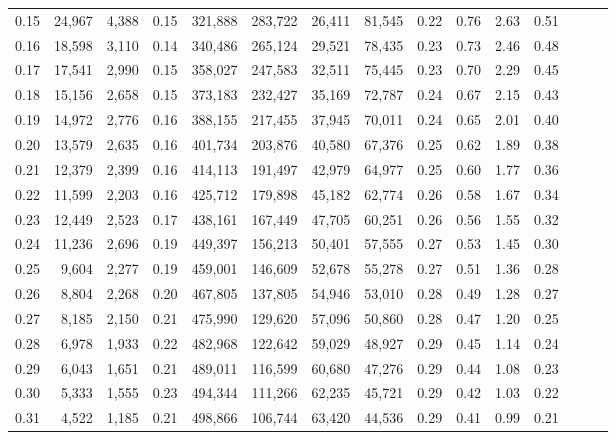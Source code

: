 \begin{tabular}{rrrrrrrrrrrrrrr}
0.15 &  24,967 &  4,388 &  0.15 &  321,888 &  283,722 &   26,411 &   81,545 &  0.22 &  0.76 &  2.63 &      0.51 \\
0.16 &  18,598 &  3,110 &  0.14 &  340,486 &  265,124 &   29,521 &   78,435 &  0.23 &  0.73 &  2.46 &      0.48 \\
0.17 &  17,541 &  2,990 &  0.15 &  358,027 &  247,583 &   32,511 &   75,445 &  0.23 &  0.70 &  2.29 &      0.45 \\
0.18 &  15,156 &  2,658 &  0.15 &  373,183 &  232,427 &   35,169 &   72,787 &  0.24 &  0.67 &  2.15 &      0.43 \\
0.19 &  14,972 &  2,776 &  0.16 &  388,155 &  217,455 &   37,945 &   70,011 &  0.24 &  0.65 &  2.01 &      0.40 \\
0.20 &  13,579 &  2,635 &  0.16 &  401,734 &  203,876 &   40,580 &   67,376 &  0.25 &  0.62 &  1.89 &      0.38 \\
0.21 &  12,379 &  2,399 &  0.16 &  414,113 &  191,497 &   42,979 &   64,977 &  0.25 &  0.60 &  1.77 &      0.36 \\
0.22 &  11,599 &  2,203 &  0.16 &  425,712 &  179,898 &   45,182 &   62,774 &  0.26 &  0.58 &  1.67 &      0.34 \\
0.23 &  12,449 &  2,523 &  0.17 &  438,161 &  167,449 &   47,705 &   60,251 &  0.26 &  0.56 &  1.55 &      0.32 \\
0.24 &  11,236 &  2,696 &  0.19 &  449,397 &  156,213 &   50,401 &   57,555 &  0.27 &  0.53 &  1.45 &      0.30 \\
0.25 &   9,604 &  2,277 &  0.19 &  459,001 &  146,609 &   52,678 &   55,278 &  0.27 &  0.51 &  1.36 &      0.28 \\
0.26 &   8,804 &  2,268 &  0.20 &  467,805 &  137,805 &   54,946 &   53,010 &  0.28 &  0.49 &  1.28 &      0.27 \\
0.27 &   8,185 &  2,150 &  0.21 &  475,990 &  129,620 &   57,096 &   50,860 &  0.28 &  0.47 &  1.20 &      0.25 \\
0.28 &   6,978 &  1,933 &  0.22 &  482,968 &  122,642 &   59,029 &   48,927 &  0.29 &  0.45 &  1.14 &      0.24 \\
0.29 &   6,043 &  1,651 &  0.21 &  489,011 &  116,599 &   60,680 &   47,276 &  0.29 &  0.44 &  1.08 &      0.23 \\
0.30 &   5,333 &  1,555 &  0.23 &  494,344 &  111,266 &   62,235 &   45,721 &  0.29 &  0.42 &  1.03 &      0.22 \\
0.31 &   4,522 &  1,185 &  0.21 &  498,866 &  106,744 &   63,420 &   44,536 &  0.29 &  0.41 &  0.99 &      0.21 \\

\end{tabular}
